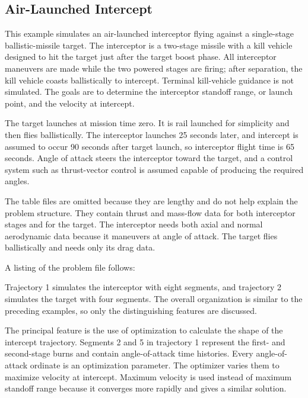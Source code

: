 \subsection{Air-Launched Intercept}\label{sec:example-air-intercept}

This example simulates an air-launched interceptor flying against a single-stage
ballistic-missile target.  The interceptor is a two-stage missile with a kill vehicle
designed to hit the target just after the target boost phase.  All interceptor
maneuvers are made while the two powered stages are firing; after separation, the
kill vehicle coasts ballistically to intercept.  Terminal kill-vehicle guidance is not
simulated.  The goals are to determine the interceptor standoff range, or launch
point, and the velocity at intercept.

The target launches at mission time zero.  It is rail launched for simplicity and then
flies ballistically.  The interceptor launches 25 seconds later, and intercept is
assumed to occur 90 seconds after target launch, so interceptor flight time is
65 seconds.  Angle of attack steers the interceptor toward the target, and a control
system such as thrust-vector control is assumed capable of producing the required
angles.

The table files are omitted because they are lengthy and do not help explain the
problem structure.  They contain thrust and mass-flow data for both interceptor
stages and for the target.  The interceptor needs both axial and normal aerodynamic
data because it maneuvers at angle of attack.  The target flies ballistically and needs
only its drag data.


A listing of the problem file follows:



Trajectory 1 simulates the interceptor with eight segments, and trajectory 2 simulates
the target with four segments.  The overall organization is similar to the preceding
examples, so only the distinguishing features are discussed.


The principal feature is the use of optimization to calculate the shape of the
intercept trajectory.  Segments 2 and 5 in trajectory 1 represent the first- and
second-stage burns and contain angle-of-attack time histories.  Every
angle-of-attack ordinate is an optimization parameter.  The optimizer varies them to
maximize velocity at intercept.  Maximum velocity is used instead of maximum
standoff range because it converges more rapidly and gives a similar solution.

